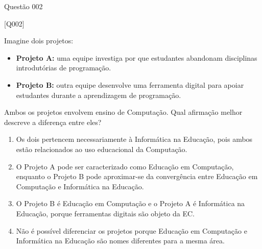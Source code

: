 \documentclass[xcolor=dvipsnames,table]{beamer}
\begin{document}
     \begin{frame}{Questão 002}

		\footnotesize

        \begin{block}{[Q002]}

            Imagine dois projetos:

            \begin{itemize}

                \item \textbf{Projeto A:} uma equipe investiga por que estudantes abandonam disciplinas introdutórias de programação.

                \item \textbf{Projeto B:} outra equipe desenvolve uma ferramenta digital para apoiar estudantes durante a aprendizagem de programação.

            \end{itemize}

            Ambos os projetos envolvem ensino de Computação. Qual afirmação melhor descreve a diferença entre eles?

        \end{block}

        \begin{enumerate}[label=(\Alph*)]

            \item Os dois pertencem necessariamente à Informática na Educação, pois ambos estão relacionados ao uso educacional da Computação.

            \item O Projeto A pode ser caracterizado como Educação em Computação, enquanto o Projeto B pode aproximar-se da convergência entre Educação em Computação e Informática na Educação.

            \item O Projeto B é Educação em Computação e o Projeto A é Informática na Educação, porque ferramentas digitais são objeto da EC.

            \item Não é possível diferenciar os projetos porque Educação em Computação e Informática na Educação são nomes diferentes para a mesma área.

        \end{enumerate}

    \end{frame}
\end{document}
